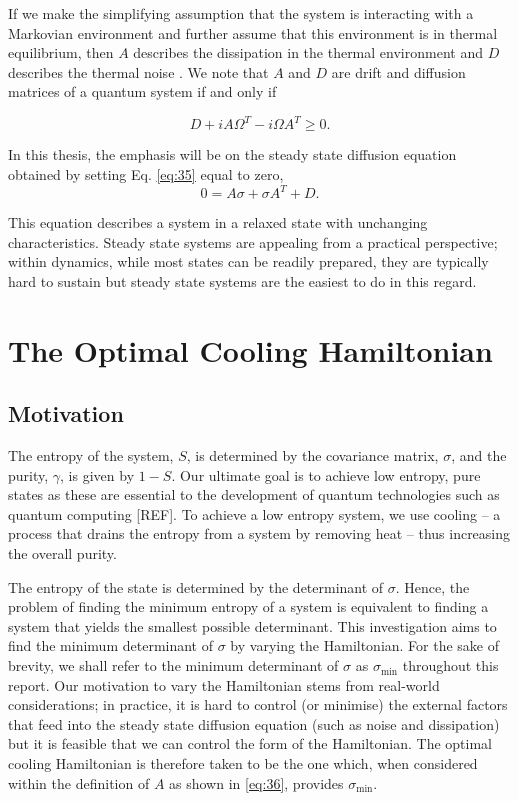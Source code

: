 \documentclass[11pt,a4paper]{article}
\numberwithin{equation}{section}
\begin{document}
	If we make the simplifying assumption that the system is interacting with a Markovian environment and further assume that this environment is in thermal equilibrium, then $A$ describes the dissipation in the thermal environment and $D$ describes the thermal noise \cite{Serafini17}. We note that $A$ and $D$ are drift and diffusion matrices of a quantum system if and only if \cite{Serafini17}
	
	\begin{equation} \label{eq:37}
	D + iA \Omega^T - i\Omega A^T \geq 0.
	\end{equation}
		
	In this thesis, the emphasis will be on the steady state diffusion equation obtained by setting Eq. \ref{eq:35} equal to zero,
	\begin{equation} \label{eq:38}
	0 = A\sigma +\sigma A^{T} + D.
	\end{equation}
	
	This equation describes a system in a relaxed state with unchanging characteristics. Steady state systems are appealing from a practical perspective; within dynamics, while most states can be readily prepared, they are typically hard to sustain but steady state systems are the easiest to do in this regard.
	
	
	\section{The Optimal Cooling Hamiltonian}
	
	\subsection{Motivation}
	The entropy of the system, $S$, is determined by the covariance matrix, $\sigma$, and the purity, $\gamma$, is given by $1-S$. Our ultimate goal is to achieve low entropy, pure states as these are essential to the development of quantum technologies such as quantum computing [REF]. To achieve a low entropy system, we use cooling -- a process that drains the entropy from a system by removing heat -- thus increasing the overall purity.
	
	The entropy of the state is determined by the determinant of $\sigma$. Hence, the problem of finding the minimum entropy of a system is equivalent to finding a system that yields the smallest possible determinant. This investigation aims to find the minimum determinant of $\sigma$ by varying the Hamiltonian. For the sake of brevity, we shall refer to the minimum determinant of $\sigma$ as $\sigma_\text{min}$ throughout this report. Our motivation to vary the Hamiltonian stems from real-world considerations; in practice, it is hard to control (or minimise) the external factors that feed into the steady state diffusion equation (such as noise and dissipation) but it is feasible that we can control the form of the Hamiltonian. The optimal cooling Hamiltonian is therefore taken to be the one which, when considered within the definition of $A$ as shown in \ref{eq:36}, provides $\sigma_\text{min}$. 
	
\end{document}
